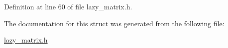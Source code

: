 Definition at line 60 of file lazy\+\_\+matrix.\+h.



The documentation for this struct was generated from the following file\+:\begin{DoxyCompactItemize}
\item 
\mbox{\hyperlink{lazy__matrix_8h}{lazy\+\_\+matrix.\+h}}\end{DoxyCompactItemize}

